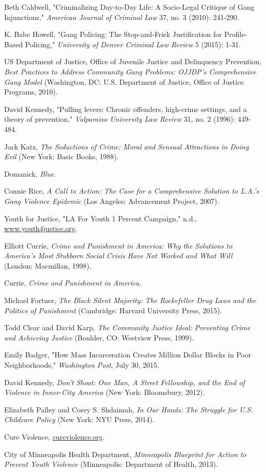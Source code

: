 \documentclass[fontset=fandol, a4paper, 12pt, openright]{ctexbook}
\begin{document}
\begin{enumerate}[label={[\arabic*]}]
    \item Beth Caldwell, "Criminalizing Day-to-Day Life: A Socio-Legal Critique of Gang Injunctions," \textit{American Journal of Criminal Law} 37, no. 3 (2010): 241-290.
    \item K. Babe Howell, "Gang Policing: The Stop-and-Frisk Justification for Profile-Based Policing," \textit{University of Denver Criminal Law Review} 5 (2015): 1-31.
    \item US Department of Justice, Office of Juvenile Justice and Delinquency Prevention, \textit{Best Practices to Address Community Gang Problems: OJJDP's Comprehensive Gang Model} (Washington, DC: U.S. Department of Justice, Office of Justice Programs, 2010).
    \item David Kennedy, "Pulling levers: Chronic offenders, high-crime settings, and a theory of prevention," \textit{Valparaiso University Law Review} 31, no. 2 (1996): 449-484.
    \item Jack Katz, \textit{The Seductions of Crime: Moral and Sensual Attractions in Doing Evil} (New York: Basic Books, 1988).
    \item Domanick, \textit{Blue}.
    \item Connie Rice, \textit{A Call to Action: The Case for a Comprehensive Solution to L.A.'s Gang Violence Epidemic} (Los Angeles: Advancement Project, 2007).
    \item Youth for Justice, "LA For Youth 1 Percent Campaign," n.d., \url{www.youth4justice.org}.
    \item Elliott Currie, \textit{Crime and Punishment in America: Why the Solutions to America's Most Stubborn Social Crisis Have Not Worked and What Will} (London: Macmillan, 1998).
    \item Currie, \textit{Crime and Punishment in America}.
    \item Michael Fortner, \textit{The Black Silent Majority: The Rockefeller Drug Laws and the Politics of Punishment} (Cambridge: Harvard University Press, 2015).
    \item Todd Clear and David Karp, \textit{The Community Justice Ideal: Preventing Crime and Achieving Justice} (Boulder, CO: Westview Press, 1999).
    \item Emily Badger, "How Mass Incarceration Creates Million Dollar Blocks in Poor Neighborhoods," \textit{Washington Post}, July 30, 2015.
    \item David Kennedy, \textit{Don't Shoot: One Man, A Street Fellowship, and the End of Violence in Inner-City America} (New York: Bloomsbury, 2012).
    \item Elizabeth Palley and Corey S. Shdaimah, \textit{In Our Hands: The Struggle for U.S. Childcare Policy} (New York: NYU Press, 2014).
    \item Cure Violence, \url{cureviolence.org}.
    \item City of Minneapolis Health Department, \textit{Minneapolis Blueprint for Action to Prevent Youth Violence} (Minneapolis: Department of Health, 2013).
\end{enumerate}
\end{document}
